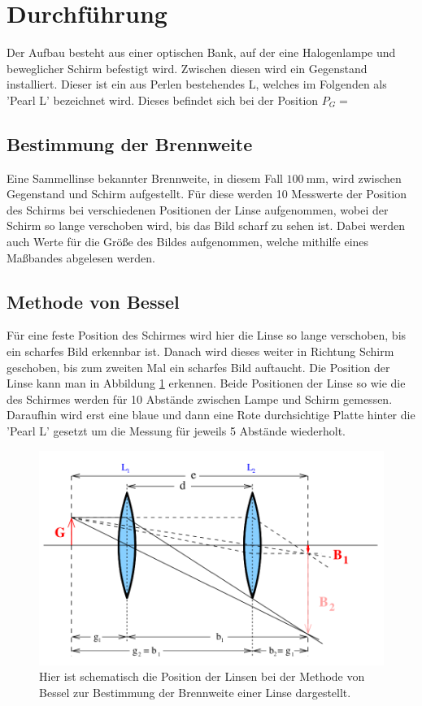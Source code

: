 \section{Durchführung}
\label{sec:Durchführung}
Der Aufbau besteht aus einer optischen Bank, auf der eine Halogenlampe und beweglicher Schirm befestigt wird. 
Zwischen diesen wird ein Gegenstand installiert. 
Dieser ist ein aus Perlen bestehendes L, welches im Folgenden als 'Pearl L' bezeichnet wird.
Dieses befindet sich bei der Position $P_G=                       $ %

\subsection{Bestimmung der Brennweite}
Eine Sammellinse bekannter Brennweite, in diesem Fall $\qty{100}{\milli\meter}$, wird zwischen Gegenstand und Schirm aufgestellt.
Für diese werden 10 Messwerte der Position des Schirms bei verschiedenen Positionen der Linse aufgenommen, wobei der Schirm so lange verschoben wird, bis das Bild scharf zu sehen ist.
Dabei werden auch Werte für die Größe des Bildes aufgenommen, welche mithilfe eines Maßbandes abgelesen werden.

\subsection{Methode von Bessel}
Für eine feste Position des Schirmes wird hier die Linse so lange verschoben, bis ein scharfes Bild erkennbar ist. 
Danach wird dieses weiter in Richtung Schirm geschoben, bis zum zweiten Mal ein scharfes Bild auftaucht.
Die Position der Linse kann man in Abbildung \ref{fig:Bessel} erkennen.
Beide Positionen der Linse so wie die des Schirmes werden für 10 Abstände zwischen Lampe und Schirm gemessen.
Daraufhin wird erst eine blaue und dann eine Rote durchsichtige Platte hinter die 'Pearl L' gesetzt um die Messung für jeweils 5 Abstände wiederholt.

\begin{figure}
    \includegraphics{../Bilder/Bessel.png}
    \caption{Hier ist schematisch die Position der Linsen bei der Methode von Bessel zur Bestimmung der Brennweite einer Linse dargestellt.}
    \label{fig:Bessel}
\end{figure}


